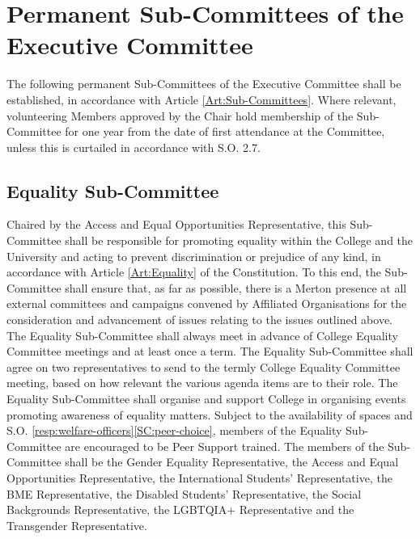 \section{Permanent Sub-Committees of the Executive Committee}
\npara The following permanent Sub-Committees of the Executive Committee shall be established, in accordance with Article \ref{Art:Sub-Committees}.
\npara Where relevant, volunteering Members approved by the Chair hold membership of the Sub-Committee for one year from the date of first attendance at the Committee, unless this is curtailed in accordance with S.O. 2.7.
\subsection{Equality Sub-Committee}
\npara Chaired by the Access and Equal Opportunities Representative, this Sub-Committee shall be responsible for promoting equality within the College and the University and acting to prevent discrimination or prejudice of any kind, in accordance with Article \ref{Art:Equality} of the Constitution. To this end, the Sub-Committee shall ensure that, as far as possible, there is a Merton presence at all external committees and campaigns convened by Affiliated Organisations for the consideration and advancement of issues relating to the issues outlined above.
\npara The Equality Sub-Committee shall always meet in advance of College Equality Committee meetings and at least once a term.
\npara The Equality Sub-Committee shall agree on two representatives to send to the termly College Equality Committee meeting, based on how relevant the various agenda items are to their role.
\npara The Equality Sub-Committee shall organise and support College in organising events promoting awareness of equality matters.
\npara Subject to the availability of spaces and S.O. \ref{resp:welfare-officers}\ref{SC:peer-choice}, members of the Equality Sub-Committee are encouraged to be Peer Support trained.
\npara The members of the Sub-Committee shall be the Gender Equality Representative, the Access and Equal Opportunities Representative, the International Students’ Representative, the BME Representative, the Disabled Students’ Representative, the Social Backgrounds Representative, the LGBTQIA+ Representative and the Transgender Representative.
